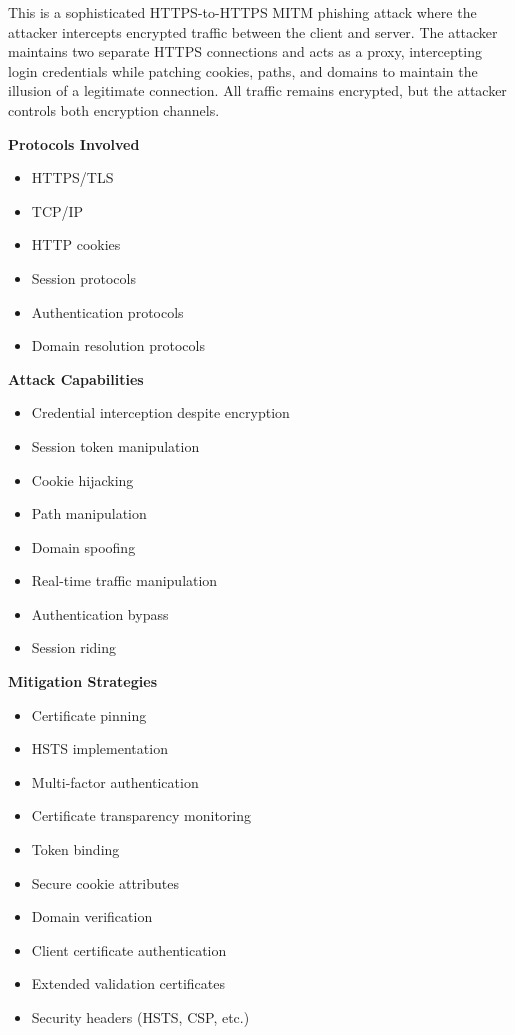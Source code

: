 This is a sophisticated HTTPS-to-HTTPS MITM phishing attack where the attacker intercepts encrypted traffic between the client and server. The attacker maintains two separate HTTPS connections and acts as a proxy, intercepting login credentials while patching cookies, paths, and domains to maintain the illusion of a legitimate connection. All traffic remains encrypted, but the attacker controls both encryption channels.

\textbf{Protocols Involved}
\begin{itemize}
    \item HTTPS/TLS
    \item TCP/IP
    \item HTTP cookies
    \item Session protocols
    \item Authentication protocols
    \item Domain resolution protocols
\end{itemize}

\textbf{Attack Capabilities}
\begin{itemize}
    \item Credential interception despite encryption
    \item Session token manipulation
    \item Cookie hijacking
    \item Path manipulation
    \item Domain spoofing
    \item Real-time traffic manipulation
    \item Authentication bypass
    \item Session riding
\end{itemize}

\textbf{Mitigation Strategies}
\begin{itemize}
    \item Certificate pinning
    \item HSTS implementation
    \item Multi-factor authentication
    \item Certificate transparency monitoring
    \item Token binding
    \item Secure cookie attributes
    \item Domain verification
    \item Client certificate authentication
    \item Extended validation certificates
    \item Security headers (HSTS, CSP, etc.)
\end{itemize}


